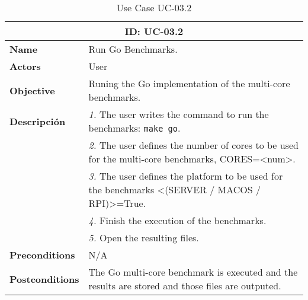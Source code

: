 \begin{table}[H]
    \centering
    \begin{tabular}{l p{10cm}}
        \toprule
        \multicolumn{2}{c}{\textbf{ID: UC-03.2}} \\
        \toprule
        \textbf{Name}                         &  Run Go Benchmarks. \\
        \textbf{Actors}                       &  User \\
        \textbf{Objective}                    &  Runing the Go implementation of the multi-core benchmarks. \\
        \multirow{1}{*}{\textbf{Descripción}} & \textsl{1.} The user writes the command to run the benchmarks: \texttt{make go}.\\
                                              & \textsl{2.} The user defines the number of cores to be used for the multi-core benchmarks, CORES=<num>.\\
                                              & \textsl{3.} The user defines the platform to be used for the benchmarks <(SERVER / MACOS / RPI)>=True.\\
                                              & \textsl{4.} Finish the execution of the benchmarks.\\
                                              & \textsl{5.} Open the resulting files.\\ 
        \textbf{Preconditions}                &  N/A \\
        \textbf{Postconditions}               &  The Go multi-core benchmark is executed and the results are stored and those files are outputed. \\
    \end{tabular}
    \caption{Use Case UC-03.2}
    \label{tab:uc-03.2}
\end{table}


